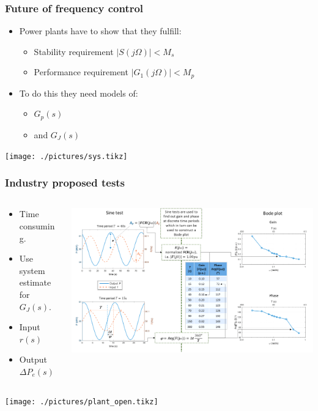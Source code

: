\begin{frame}
	\frametitle{Future of frequency control}
		\begin{itemize}
			\item Power plants have to show that they fulfill:
				\begin{itemize}
					\item Stability requirement $|S(j\Omega)| < M_s$
					\item Performance requirement $|G_1(j\Omega)| < M_p$
				\end{itemize}
			\item To do this they need models of:
				\begin{itemize}
					\item $G_p(s)$
					\item and $G_J(s)$
				\end{itemize}
		\end{itemize}
	\texttt{[image: ./pictures/sys.tikz]}
\end{frame}
\begin{frame}
	\frametitle{Industry proposed tests}
	\begin{columns}
		\begin{column}{0.3\textwidth}
			\begin{itemize}
				\item Time consuming.
				\item Use system estimate for $G_J(s)$.
				\item Input $r(s)$
				\item Output $\Delta P_e(s)$
			\end{itemize}
		\end{column}
		\begin{column}{0.7\textwidth}
				\includegraphics[width=\textwidth]{./pictures/tests.png}
		\end{column}
	\end{columns}
	\texttt{[image: ./pictures/plant\_open.tikz]}
\end{frame}
